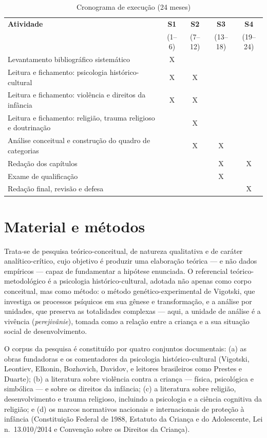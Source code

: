 \documentclass[
    a4paper,
    12pt,
    oneside,
    section=TITLE,
    brazilian,
    english
]{abntex2}
\begin{document}
\begin{SingleSpace}
\begin{table}[h]
\centering
\caption{Cronograma de execução (24 meses)}
\label{tab:cronograma}
\begin{tabular}{p{7.4cm} c c c c}
\toprule
\textbf{Atividade} & \textbf{S1} & \textbf{S2} & \textbf{S3} & \textbf{S4} \\
 & (1--6) & (7--12) & (13--18) & (19--24) \\
\midrule
Levantamento bibliográfico sistemático & X & & & \\
Leitura e fichamento: psicologia histórico-cultural & X & X & & \\
Leitura e fichamento: violência e direitos da infância & X & X & & \\
Leitura e fichamento: religião, trauma religioso e doutrinação & & X & & \\
Análise conceitual e construção do quadro de categorias & & X & X & \\
Redação dos capítulos & & & X & X \\
Exame de qualificação & & & X & \\
Redação final, revisão e defesa & & & & X \\
\bottomrule
\end{tabular}
\end{table}
\end{SingleSpace}

\section{Material e métodos}

Trata-se de pesquisa teórico-conceitual, de natureza qualitativa e de caráter analítico-crítico, cujo objetivo é produzir uma elaboração teórica --- e não dados empíricos --- capaz de fundamentar a hipótese enunciada. O referencial teórico-metodológico é a psicologia histórico-cultural, adotada não apenas como corpo conceitual, mas como método: o método genético-experimental de Vigotski, que investiga os processos psíquicos em sua gênese e transformação, e a análise por unidades, que preserva as totalidades complexas --- aqui, a unidade de análise é a vivência (\emph{perejivânie}), tomada como a relação entre a criança e a sua situação social de desenvolvimento.

O corpus da pesquisa é constituído por quatro conjuntos documentais: (a) as obras fundadoras e os comentadores da psicologia histórico-cultural (Vigotski, Leontiev, Elkonin, Bozhovich, Davidov, e leitores brasileiros como Prestes e Duarte); (b) a literatura sobre violência contra a criança --- física, psicológica e simbólica --- e sobre os direitos da infância; (c) a literatura sobre religião, desenvolvimento e trauma religioso, incluindo a psicologia e a ciência cognitiva da religião; e (d) os marcos normativos nacionais e internacionais de proteção à infância (Constituição Federal de 1988, Estatuto da Criança e do Adolescente, Lei n.~13.010/2014 e Convenção sobre os Direitos da Criança).
\end{document}
